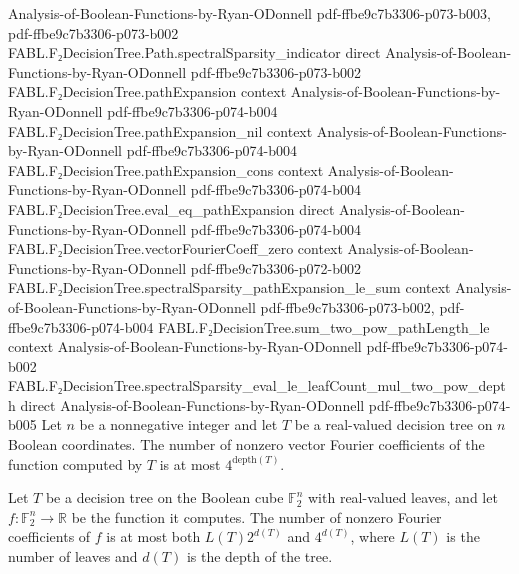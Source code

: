 \begin{theorem}
  {Analysis-of-Boolean-Functions-by-Ryan-ODonnell}
  {pdf-ffbe9c7b3306-p073-b003,
    pdf-ffbe9c7b3306-p073-b002}
\proofstep
  {FABL.F₂DecisionTree.Path.spectralSparsity_indicator}
  {direct}
  {Analysis-of-Boolean-Functions-by-Ryan-ODonnell}
  {pdf-ffbe9c7b3306-p073-b002}
\proofstep
  {FABL.F₂DecisionTree.pathExpansion}
  {context}
  {Analysis-of-Boolean-Functions-by-Ryan-ODonnell}
  {pdf-ffbe9c7b3306-p074-b004}
\proofstep
  {FABL.F₂DecisionTree.pathExpansion_nil}
  {context}
  {Analysis-of-Boolean-Functions-by-Ryan-ODonnell}
  {pdf-ffbe9c7b3306-p074-b004}
\proofstep
  {FABL.F₂DecisionTree.pathExpansion_cons}
  {context}
  {Analysis-of-Boolean-Functions-by-Ryan-ODonnell}
  {pdf-ffbe9c7b3306-p074-b004}
\proofstep
  {FABL.F₂DecisionTree.eval_eq_pathExpansion}
  {direct}
  {Analysis-of-Boolean-Functions-by-Ryan-ODonnell}
  {pdf-ffbe9c7b3306-p074-b004}
\proofstep
  {FABL.F₂DecisionTree.vectorFourierCoeff_zero}
  {context}
  {Analysis-of-Boolean-Functions-by-Ryan-ODonnell}
  {pdf-ffbe9c7b3306-p072-b002}
\proofstep
  {FABL.F₂DecisionTree.spectralSparsity_pathExpansion_le_sum}
  {context}
  {Analysis-of-Boolean-Functions-by-Ryan-ODonnell}
  {pdf-ffbe9c7b3306-p073-b002,
    pdf-ffbe9c7b3306-p074-b004}
\proofstep
  {FABL.F₂DecisionTree.sum_two_pow_pathLength_le}
  {context}
  {Analysis-of-Boolean-Functions-by-Ryan-ODonnell}
  {pdf-ffbe9c7b3306-p074-b002}
\proofstep
  {FABL.F₂DecisionTree.spectralSparsity_eval_le_leafCount_mul_two_pow_depth}
  {direct}
  {Analysis-of-Boolean-Functions-by-Ryan-ODonnell}
  {pdf-ffbe9c7b3306-p074-b005}
Let $n$ be a nonnegative integer and let $T$ be a real-valued decision tree on $n$
Boolean coordinates. The number of nonzero vector Fourier coefficients of the function
computed by $T$ is at most $4^{\mathrm{depth}(T)}$.
\end{theorem}

\begin{theorem}
\leanok
{}
Let $T$ be a decision tree on the Boolean cube $\mathbb{F}_2^n$ with real-valued
leaves, and let $f:\mathbb{F}_2^n\to\mathbb{R}$ be the function it computes. The number
of nonzero Fourier coefficients of $f$ is at most both $L(T)2^{d(T)}$ and $4^{d(T)}$,
where $L(T)$ is the number of leaves and $d(T)$ is the depth of the tree.
\end{theorem}

